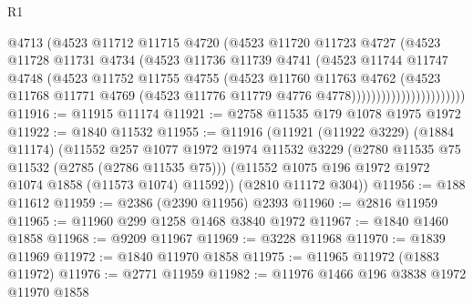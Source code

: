 \begin{lexlean}{R1}
\begin{coremodule}
                                @4713
                                (@4523
                                  @11712
                                  @11715
                                  @4720
                                  (@4523
                                    @11720
                                    @11723
                                    @4727
                                    (@4523
                                      @11728
                                      @11731
                                      @4734
                                      (@4523
                                        @11736
                                        @11739
                                        @4741
                                        (@4523
                                          @11744
                                          @11747
                                          @4748
                                          (@4523
                                            @11752
                                            @11755
                                            @4755
                                            (@4523
                                              @11760
                                              @11763
                                              @4762
                                              (@4523
                                                @11768
                                                @11771
                                                @4769
                                                (@4523
                                                  @11776
                                                  @11779
                                                  @4776
                                                  @4778)))))))))))))))))))))))
@11916 := @11915 @11174
@11921 := @2758 @11535 @179 @1078 @1975 @1972
@11922 := @1840 @11532
@11955 := @11916
    (@11921
      (@11922 @3229)
      (@1884 @11174)
      (@11552
        @257
        @1077
        @1972
        @1974
        @11532
        @3229
        (@2780 @11535 @75 @11532 (@2785 (@2786 @11535 @75)))
        (@11552 @1075 @196 @1972 @1972 @1074 @1858 (@11573 @1074) @11592))
      (@2810 @11172 @304))
@11956 := @188 @11612
@11959 := @2386 (@2390 @11956) @2393
@11960 := @2816 @11959
@11965 := @11960 @299 @1258 @1468 @3840 @1972
@11967 := @1840 @1460 @1858
@11968 := @9209 @11967
@11969 := @3228 @11968
@11970 := @1839 @11969
@11972 := @1840 @11970 @1858
@11975 := @11965 @11972 (@1883 @11972)
@11976 := @2771 @11959
@11982 := @11976 @1466 @196 @3838 @1972 @11970 @1858

\end{coremodule}
\end{lexlean}
